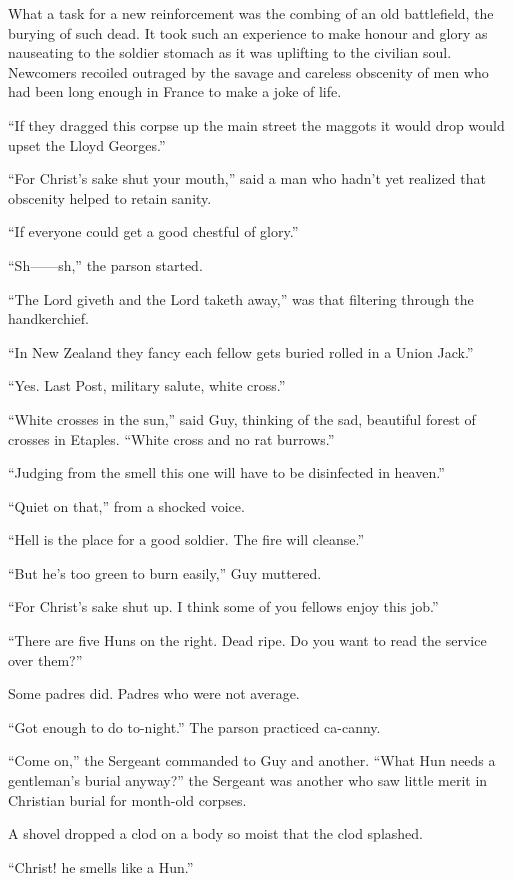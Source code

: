 What a task for a new reinforcement was the combing of an old battlefield, the burying of such dead. It took such an experience to make honour and glory as nauseating to the soldier stomach as it was uplifting to the civilian soul. Newcomers recoiled outraged by the savage and careless obscenity of men who had been long enough in France to make a joke of life.

``If they dragged this corpse up the main street the maggots it would drop would upset the Lloyd Georges.''

``For Christ's sake shut your mouth,'' said a man who hadn't yet realized that obscenity helped to retain sanity.

``If everyone could get a good chestful of glory.''

``Sh------sh,'' the parson started.

``The Lord giveth and the Lord taketh away,'' was that filtering through the handkerchief.

``In New Zealand they fancy each fellow gets buried rolled in a Union Jack.''

``Yes. Last Post, military salute, white cross.''

``White crosses in the sun,'' said Guy, thinking of the sad, beautiful forest of crosses in Etaples. ``White cross and no rat burrows.''

``Judging from the smell this one will have to be disinfected in heaven.''

``Quiet on that,'' from a shocked voice.

``Hell is the place for a good soldier. The fire will cleanse.''

``But he's too green to burn easily,'' Guy muttered.

``For Christ's sake shut up. I think some of you fellows enjoy this job.''

``There are five Huns on the right. Dead ripe. Do you want to read the service over them?''

Some padres did. Padres who were not average.

``Got enough to do to-night.'' The parson practiced ca-canny.

``Come on,'' the Sergeant commanded to Guy and another. ``What Hun needs a gentleman's burial anyway?'' the Sergeant was another who saw little merit in Christian burial for month-old corpses.

A shovel dropped a clod on a body so moist that the clod splashed.

``Christ! he smells like a Hun.''

